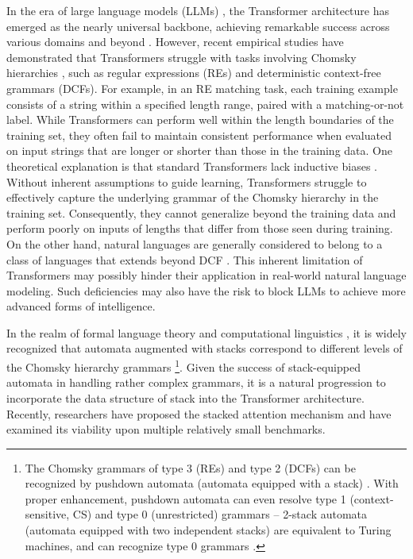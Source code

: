 \documentclass{article}
\begin{document}
In the era of large language models (LLMs) \citep{GPT-4}, the Transformer architecture has emerged as the nearly universal backbone, achieving remarkable success across various domains and beyond \citep{bi2024deepseek,bai2023qwen, zhang2024deep}.
However, recent empirical studies \citep{deletang2022neural, hahn2020theoretical} have demonstrated that Transformers struggle with tasks involving Chomsky hierarchies \citep{chomsky1956three}, such as regular expressions (REs) and deterministic context-free grammars (DCFs). 
For example, in an RE matching task, each training example consists of a string within a specified length range, paired with a matching-or-not label. 
While Transformers can perform well within the length boundaries of the training set, they often fail to maintain consistent performance when evaluated on input strings that are longer or shorter than those in the training data. 
One theoretical explanation is that standard Transformers lack inductive biases \citep{mitchell1980need, battaglia1806relational, sartran2022Transformer}.
Without inherent assumptions to guide learning, Transformers struggle to effectively capture the underlying grammar of the Chomsky hierarchy in the training set. 
Consequently, they cannot generalize beyond the training data and perform poorly on inputs of lengths that differ from those seen during training.
On the other hand, natural languages are generally considered to belong to a class of languages that extends beyond DCF \citep{gazdar1982generalized, chomsky1956three, shieber1985evidence}.
This inherent limitation of Transformers may possibly hinder their application in real-world natural language modeling. Such deficiencies may also have the risk to block LLMs to achieve more advanced forms of intelligence.


In the realm of formal language theory and computational linguistics \citep{chomsky1956three, savage1998exploring, sipser1996introduction}, it is widely recognized that automata augmented with stacks correspond to different levels of the Chomsky hierarchy grammars \footnote{The Chomsky grammars of type 3 (REs) and type 2 (DCFs) can be recognized by pushdown automata (automata equipped with a stack) \citep{chomsky1956three, chomsky1959algebraic}. With proper enhancement, pushdown automata can even resolve type 1 (context-sensitive, CS) and type 0 (unrestricted) grammars -- 2-stack automata (automata equipped with two independent stacks) are equivalent to Turing machines, and can recognize type 0 grammars \citep{yau1969computation}.}. 
Given the success of stack-equipped automata in handling rather complex grammars, it is a natural progression to incorporate the data structure of stack into the Transformer architecture.
Recently, researchers have proposed the stacked attention mechanism \citep{dusell2024stack, li2024Transformer} and have examined its viability upon multiple relatively small benchmarks.
\end{document}
